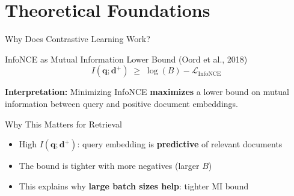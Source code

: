 \documentclass[aspectratio=169]{beamer}
\newif\ifanimated
\newcommand{\cpause}{\ifanimated\pause\fi}
\newcommand{\vq}{\mathbf{q}}
\newcommand{\vd}{\mathbf{d}}
\begin{document}
\section{Theoretical Foundations}

\begin{frame}[plain]
\sectionpage
\end{frame}

\begin{frame}{Why Does Contrastive Learning Work?}
\begin{block}{InfoNCE as Mutual Information Lower Bound (Oord et al., 2018)}
$$I(\vq; \vd^+) \;\geq\; \log(B) - \mathcal{L}_{\text{InfoNCE}}$$
\end{block}

\vspace{0.5em}

\textbf{Interpretation:} Minimizing InfoNCE \textbf{maximizes} a lower bound on mutual information between query and positive document embeddings.

\cpause
\vspace{0.5em}

\begin{exampleblock}{Why This Matters for Retrieval}
\begin{itemize}
    \item High $I(\vq; \vd^+)$: query embedding is \textbf{predictive} of relevant documents
    \item The bound is tighter with more negatives (larger $B$)
    \item This explains why \textbf{large batch sizes help}: tighter MI bound
\end{itemize}
\end{exampleblock}
\end{frame}
\end{document}
